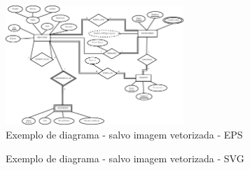 \begin{figure}
    \centering
	\includegraphics[width=0.6\textwidth]{exemplos/diagramas/ER.eps}
    \caption{Exemplo de diagrama - salvo imagem vetorizada - EPS}
    \label{fig:uml_dia_vetorizado_eps}
\end{figure}

\begin{figure}
    \centering
	
    \caption{Exemplo de diagrama - salvo imagem vetorizada - SVG}
    \label{fig:uml_dia_vetorizado_svg}
\end{figure}




